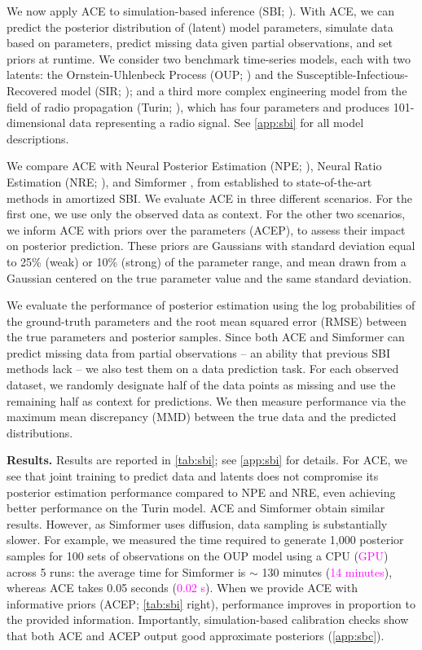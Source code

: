\documentclass[twoside]{article}
\begin{document}
\vspace{-0.25em}
We now apply ACE to simulation-based inference (SBI; \citealp{cranmer2020frontier}). With ACE, we can predict the posterior distribution of (latent) model parameters, simulate data based on parameters, predict missing data given partial observations, and set priors at runtime. We consider two benchmark time-series models, each with two latents: the Ornstein-Uhlenbeck Process (OUP; \citealt{uhlenbeck1930theory}) and the Susceptible-Infectious-Recovered model (SIR; \citealt{kermack1927contribution}); and a third more complex engineering model from the field of radio propagation (Turin;  \citealp{turin1972statistical}), which has four parameters and produces 101-dimensional data representing a radio signal. See \cref{app:sbi} for all model descriptions.

We compare ACE with Neural Posterior Estimation (NPE; \citealt{greenberg2019automatic}), Neural Ratio Estimation (NRE; \citealt{miller2022contrastive}), and Simformer \citep{gloeckler2024all}, from established to state-of-the-art methods in amortized SBI. We evaluate ACE in three different scenarios. For the first one, we use only the observed data as context. For the other two scenarios, we inform ACE with priors over the parameters (ACEP), to assess their impact on posterior prediction. These priors are Gaussians with standard deviation equal to 25\% (weak) or 10\% (strong) of the parameter range, and mean drawn from a Gaussian centered on the true parameter value and the same standard deviation.

We evaluate the performance of posterior estimation using the log probabilities of the ground-truth parameters and the root mean squared error (RMSE) between the true parameters and posterior samples. Since both ACE and Simformer can predict missing data from partial observations -- an ability that previous SBI methods lack -- we also test them on a data prediction task. For each observed dataset, we randomly designate half of the data points as missing and use the remaining half as context for predictions. We then measure performance via the maximum mean discrepancy (MMD) between the true data and the predicted distributions.


\textbf{Results.} Results are reported in \cref{tab:sbi}; see \cref{app:sbi} for details. For ACE, we see that joint training to predict data and latents does not compromise its posterior estimation performance compared to NPE and NRE, even achieving better performance on the Turin model. ACE and Simformer obtain similar results. However, as Simformer uses diffusion, data sampling is substantially slower. For example, we measured the time required to generate 1,000 posterior samples for 100 sets of observations on the OUP model using a CPU (\textcolor{magenta}{GPU}) across 5 runs: the average time for Simformer is $\sim$ 130 minutes (\textcolor{magenta}{14 minutes}), whereas ACE takes 0.05 seconds (\textcolor{magenta}{0.02 s}). 
When we provide ACE with informative priors (ACEP; \cref{tab:sbi} right), performance improves in proportion to the provided information.
Importantly, simulation-based calibration checks \citep{talts2018validating} show that both ACE and ACEP output good approximate posteriors (\cref{app:sbc}).
\end{document}
